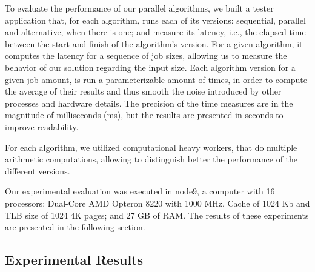 \documentclass[conference,compsoc]{IEEEtran}
\begin{document}

To evaluate the performance of our parallel algorithms, we built a tester application that, for each algorithm, runs each of its versions: sequential, parallel and alternative, when there is one; and measure its latency, i.e., the elapsed time between the start and finish of the algorithm's version. For a given algorithm, it computes the latency for a sequence of job sizes, allowing us to measure the behavior of our solution regarding the input size. Each algorithm version for a given job amount, is run a parameterizable amount of times, in order to compute the average of their results and thus smooth the noise introduced by other processes and hardware details. The precision of the time measures are in the magnitude of milliseconds (ms), but the results are presented in seconds to improve readability.

For each algorithm, we utilized computational heavy workers, that do multiple arithmetic computations, allowing to distinguish better the performance of the different versions.

Our experimental evaluation was executed in node9, a computer with 16 processors: Dual-Core AMD Opteron 8220 with 1000 MHz, Cache of 1024 Kb and
TLB size of 1024 4K pages; and 27 GB of RAM. The results of these experiments are presented in the following section.

\subsection{Experimental Results}
\end{document}
